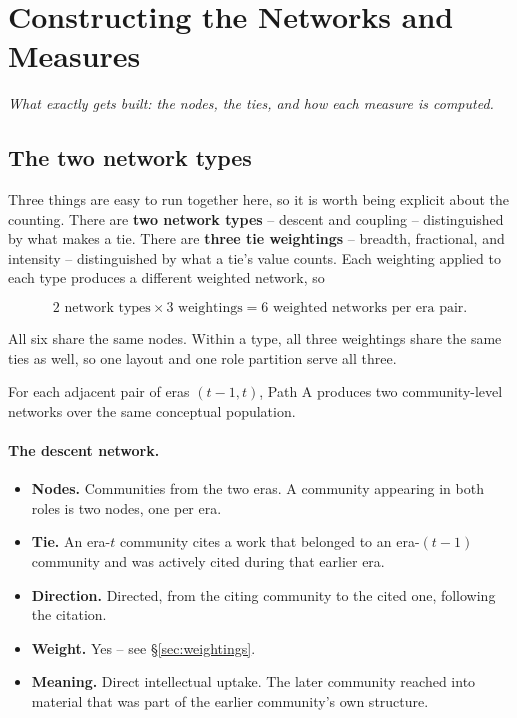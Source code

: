 \documentclass[11pt]{article}
\newcommand{\seccap}[1]{{\slshape\small #1\par}\vspace{0.8em}}
\begin{document}
\section{Constructing the Networks and Measures}
\label{sec:networks}
\seccap{What exactly gets built: the nodes, the ties, and how each measure is computed.}

\subsection{The two network types}

Three things are easy to run together here, so it is worth being explicit about the
counting. There are \textbf{two network types} -- descent and coupling -- distinguished by
what makes a tie. There are \textbf{three tie weightings} -- breadth, fractional, and
intensity -- distinguished by what a tie's value counts. Each weighting applied to each
type produces a different weighted network, so

\[
2 \text{ network types} \times 3 \text{ weightings} = 6 \text{ weighted networks per era
pair.}
\]

All six share the same nodes. Within a type, all three weightings share the same ties as
well, so one layout and one role partition serve all three.

For each adjacent pair of eras $(t{-}1, t)$, Path A produces two community-level networks
over the same conceptual population.

\paragraph{The descent network.}
\begin{itemize}[leftmargin=2em, itemsep=1pt]
  \item \textbf{Nodes.} Communities from the two eras. A community appearing in both roles
        is two nodes, one per era.
  \item \textbf{Tie.} An era-$t$ community cites a work that belonged to an era-$(t{-}1)$
        community and was actively cited during that earlier era.
  \item \textbf{Direction.} Directed, from the citing community to the cited one, following
        the citation.
  \item \textbf{Weight.} Yes -- see \S\ref{sec:weightings}.
  \item \textbf{Meaning.} Direct intellectual uptake. The later community reached into
        material that was part of the earlier community's own structure.
\end{itemize}
\end{document}

